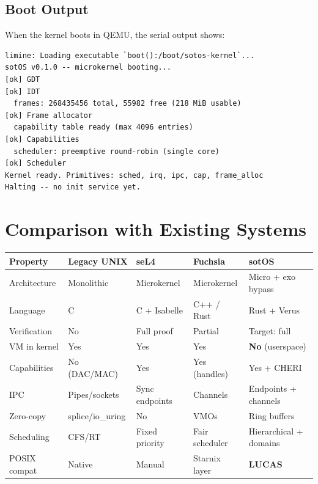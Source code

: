 \documentclass[11pt,a4paper]{article}
\begin{document}
\subsection{Boot Output}

When the kernel boots in QEMU, the serial output shows:

\begin{lstlisting}[style=rust, numbers=none, frame=single, backgroundcolor=\color{black!90},
  basicstyle=\ttfamily\small\color{green!70}]
limine: Loading executable `boot():/boot/sotos-kernel`...
sotOS v0.1.0 -- microkernel booting...
[ok] GDT
[ok] IDT
  frames: 268435456 total, 55982 free (218 MiB usable)
[ok] Frame allocator
  capability table ready (max 4096 entries)
[ok] Capabilities
  scheduler: preemptive round-robin (single core)
[ok] Scheduler
Kernel ready. Primitives: sched, irq, ipc, cap, frame_alloc
Halting -- no init service yet.
\end{lstlisting}

\section{Comparison with Existing Systems}

\begin{center}
\begin{tabularx}{\textwidth}{l *{4}{>{\centering\arraybackslash}X}}
\toprule
\textbf{Property} & \textbf{Legacy UNIX} & \textbf{seL4} & \textbf{Fuchsia} & \textbf{sotOS} \\
\midrule
Architecture      & Monolithic     & Microkernel    & Microkernel      & Micro + exo bypass \\
Language          & C              & C + Isabelle   & C++ / Rust       & Rust + Verus \\
Verification      & No             & Full proof     & Partial          & Target: full \\
VM in kernel      & Yes            & Yes            & Yes              & \textbf{No} (userspace) \\
Capabilities      & No (DAC/MAC)   & Yes            & Yes (handles)    & Yes + CHERI \\
IPC               & Pipes/sockets  & Sync endpoints & Channels         & Endpoints + channels \\
Zero-copy         & splice/io\_uring & No            & VMOs             & Ring buffers \\
Scheduling        & CFS/RT         & Fixed priority & Fair scheduler   & Hierarchical + domains \\
POSIX compat      & Native         & Manual         & Starnix layer    & \textbf{LUCAS} \\
\bottomrule
\end{tabularx}
\end{center}
\end{document}
